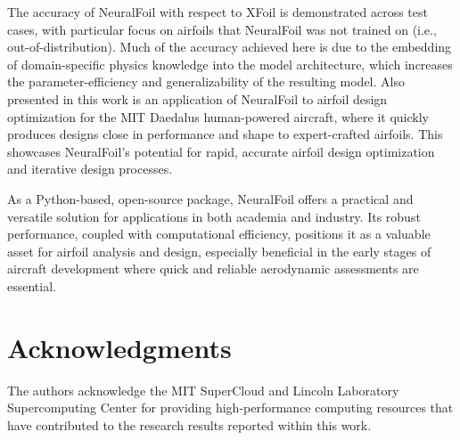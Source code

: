\documentclass[conf]{new-aiaa}
\begin{document}
    The accuracy of NeuralFoil with respect to XFoil is demonstrated across test cases, with particular focus on airfoils that NeuralFoil was not trained on (i.e., out-of-distribution). Much of the accuracy achieved here is due to the embedding of domain-specific physics knowledge into the model architecture, which increases the parameter-efficiency and generalizability of the resulting model. Also presented in this work is an application of NeuralFoil to airfoil design optimization for the MIT Daedalus human-powered aircraft, where it quickly produces designs close in performance and shape to expert-crafted airfoils. This showcases NeuralFoil's potential for rapid, accurate airfoil design optimization and iterative design processes.

    As a Python-based, open-source package, NeuralFoil offers a practical and versatile solution for applications in both academia and industry. Its robust performance, coupled with computational efficiency, positions it as a valuable asset for airfoil analysis and design, especially beneficial in the early stages of aircraft development where quick and reliable aerodynamic assessments are essential.

    \section*{Acknowledgments}
    The authors acknowledge the MIT SuperCloud and Lincoln Laboratory Supercomputing Center for providing high-performance computing resources that have contributed to the research results reported within this work.

    
\end{document}
